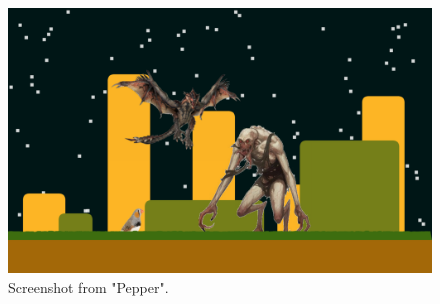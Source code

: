 \documentclass[paper=a4, fontsize=12pt]{scrartcl} 	%
\begin{document}
\begin{figure}
	\includegraphics[scale=0.3]{pepper.png}
	\caption{\label{pepper} Screenshot from "Pepper".}
\end{figure}
\end{document}
